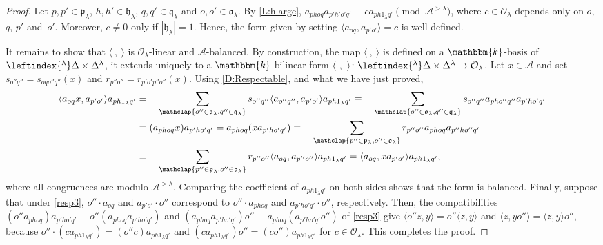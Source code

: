 \documentclass[a4paper,11pt]{amsart}
\let\<\langle
\let\>\rangle
\numberwithin{equation}{subsection}
\theoremstyle{definition}
\theoremstyle{theorem}
\theoremstyle{remark}
\newcommand\CA{\mathcal{A}}
\newcommand\CO{\mathcal{O}}
\newcommand\plam[1][\lambda]{\mathfrak{p}_{#1}}
\newcommand\hlam[1][\lambda]{\mathfrak{h}_{#1}}
\newcommand\qlam[1][\lambda]{\mathfrak{q}_{#1}}
\newcommand\Olam[1][\lambda]{\CO_{#1}}
\newcommand\olam[1][\lambda]{\mathfrak{o}_{#1}}
\newcommand\kk{\mathbbm{k}}
\begin{document}
  \begin{proof}
     Let $p,p'\in\plam$, $h,h'\in\hlam$, $q,q'\in\qlam$ and $o,o'\in\olam$.
     By \autoref{L:hlarge},
     $a_{phoq}a_{p'h'o'q'}\equiv ca_{ph1_\lambda q'}
        \pmod{\CA^{>\lambda}}$,
     where $c\in\Olam$ depends only on $o$, $q$,
     $p'$ and~$o'$. Moreover, $c\ne0$ only if $|\hlam|=1$. Hence,
     the form given by setting $\<a_{oq},a_{p'o'}\>=c$ is
     well-defined.

     It remains to show that $\<\ ,\ \>$ is $\Olam$-linear and
     $\CA$-balanced. By construction, the map
     $\<\ ,\ \>$ is defined on a $\kk$-basis of
     $\leftindex{^\lambda}\Delta\times\Delta^\lambda$, it extends uniquely to a
     $\kk$-bilinear form
     $\<\ ,\ \>\colon\leftindex{^\lambda}\Delta\times\Delta^\lambda\to\Olam$.
     Let $x\in \CA$ and set $s_{o''q''}=s_{oqo''q''}(x)$ and
     $r_{p''o''}=r_{p'o'p''o''}(x)$. Using \autoref{D:Respectable}, and
     what we have just proved,
     \begin{align*}
        \<a_{oq}x, a_{p'o'}\>a_{ph1_\lambda q'}
           &=\quad \sum_{\mathclap{o''\in\olam, q''\in\qlam}}
                  s_{o''q''}\<a_{o''q''},a_{p'o'}\>a_{ph1_\lambda q'}
            \equiv \quad\sum_{\mathclap{o''\in\olam, q''\in\qlam}}
                  s_{o''q''}a_{pho''q''}a_{p'ho'q'}\\
          & \equiv(a_{phoq}x)a_{p'ho'q'}=a_{phoq}(xa_{p'ho'q'})
           \equiv\quad\sum_{\mathclap{p''\in\plam, o''\in\olam}}
               r_{p''o''}a_{phoq}a_{p''ho''q'}\\
         &   \equiv\quad\sum_{\mathclap{p''\in\plam, o''\in\olam}}
               r_{p''o''}\<a_{oq},a_{p''o''}\>a_{ph1_\lambda q'}
           =\<a_{oq},xa_{p'o'}\>a_{ph1_\lambda q'},
     \end{align*}
     where all congruences are modulo $\CA^{>\lambda}$. Comparing the
     coefficient of $a_{ph1_\lambda q'}$ on both sides shows that the form is
     balanced. Finally, suppose that under \autoref{resp3}, $o''\cdot a_{oq}$ and $a_{p'o'}\cdot o''$
     correspond to $o''\cdot a_{phoq}$ and $a_{p'ho'q'}\cdot o''$,
     respectively. Then,  the compatibilities
     $(o''a_{phoq})a_{p'ho'q'}\equiv o''(a_{phoq}a_{p'ho'q'})$ and
     $(a_{phoq}a_{p'ho'q'})o''\equiv a_{phoq}(a_{p'ho'q'}o'')$ of \autoref{resp3}
     give $\<o''z,y\>=o''\<z,y\>$ and $\<z,yo''\>=\<z,y\>o''$, because
     $o''\cdot(ca_{ph1_\lambda q'})=(o''c)a_{ph1_\lambda q'}$ and
     $(ca_{ph1_\lambda q'})o''=(co'')a_{ph1_\lambda q'}$ for $c\in\Olam$.
     This completes the proof.
  \end{proof}
\end{document}

